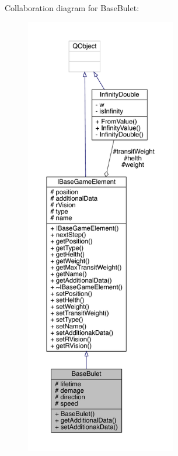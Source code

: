Collaboration diagram for Base\+Bulet\+:
\nopagebreak
\begin{figure}[H]
\begin{center}
\leavevmode
\includegraphics[height=550pt]{dd/db2/a00151}
\end{center}
\end{figure}
